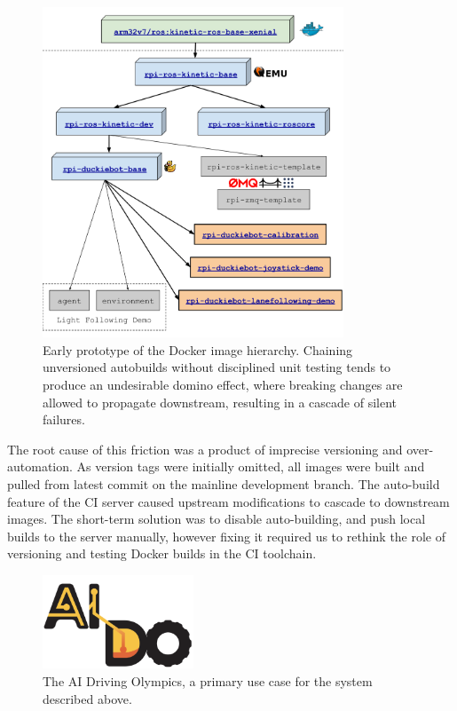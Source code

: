 \documentclass[12pt,initial,twoside,maitrise]{dms}
\numberwithin{equation}{section}
\numberwithin{table}{chapter}
\numberwithin{figure}{chapter}
\begin{document}
\begin{figure}
\includegraphics[width=0.80\textwidth]{image_provenance.png}
\caption{Early prototype of the Docker image hierarchy. Chaining unversioned autobuilds without disciplined unit testing tends to produce an undesirable domino effect, where breaking changes are allowed to propagate downstream, resulting in a cascade of silent failures.}
    \label{fig:early_prototype}
\end{figure}

The root cause of this friction was a product of imprecise versioning and over-automation. As version tags were initially omitted, all images were built and pulled from latest commit on the mainline development branch. The auto-build feature of the CI server caused upstream modifications to cascade to downstream images. The short-term solution was to disable auto-building, and push local builds to the server manually, however fixing it required us to rethink the role of versioning and testing Docker builds in the CI toolchain.

\begin{figure}
    \includegraphics[width=0.40\textwidth]{aido_logo.png}
    \caption{The AI Driving Olympics, a primary use case for the system described above.}
    \label{fig:aido_logo}
\end{figure}
\end{document}
